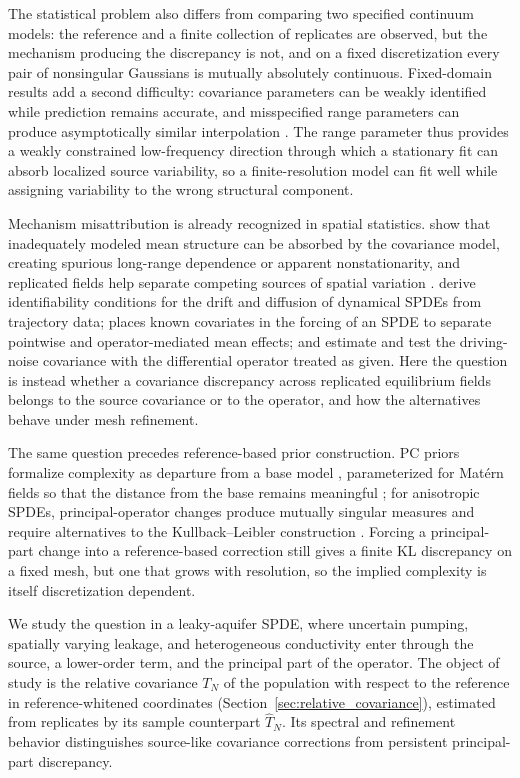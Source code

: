 \documentclass[11pt]{article}
\numberwithin{table}{section}
\numberwithin{figure}{section}
\begin{document}
The statistical problem also differs from comparing two specified continuum models: the reference and a finite collection of replicates are observed, but the mechanism producing the discrepancy is not, and on a fixed discretization every pair of nonsingular Gaussians is mutually absolutely continuous. Fixed-domain results add a second difficulty: covariance parameters can be weakly identified while prediction remains accurate, and misspecified range parameters can produce asymptotically similar interpolation \citep{Stein1999,Zhang2004,KaufmanShaby2013}. The range parameter thus provides a weakly constrained low-frequency direction through which a stationary fit can absorb localized source variability, so a finite-resolution model can fit well while assigning variability to the wrong structural component.

Mechanism misattribution is already recognized in spatial statistics. \citet{Fuglstad2015} show that inadequately modeled mean structure can be absorbed by the covariance model, creating spurious long-range dependence or apparent nonstationarity, and replicated fields help separate competing sources of spatial variation \citep{Ingebrigtsen2015}. \citet{CuiHe2027} derive identifiability conditions for the drift and diffusion of dynamical SPDEs from trajectory data; \citet{Bolin2026} places known covariates in the forcing of an SPDE to separate pointwise and operator-mediated mean effects; and \citet{PeterssonSchroers2025} estimate and test the driving-noise covariance with the differential operator treated as given. Here the question is instead whether a covariance discrepancy across replicated equilibrium fields belongs to the source covariance or to the operator, and how the alternatives behave under mesh refinement.

The same question precedes reference-based prior construction. PC priors formalize complexity as departure from a base model \citep{Simpson2017}, parameterized for Mat\'ern fields so that the distance from the base remains meaningful \citep{Fuglstad2019}; for anisotropic SPDEs, principal-operator changes produce mutually singular measures and require alternatives to the Kullback--Leibler construction \citep{LlamazaresElias2026}. Forcing a principal-part change into a reference-based correction still gives a finite KL discrepancy on a fixed mesh, but one that grows with resolution, so the implied complexity is itself discretization dependent.

We study the question in a leaky-aquifer SPDE, where uncertain pumping, spatially varying leakage, and heterogeneous conductivity enter through the source, a lower-order term, and the principal part of the operator. The object of study is the relative covariance $T_N$ of the population with respect to the reference in reference-whitened coordinates (Section~\ref{sec:relative_covariance}), estimated from replicates by its sample counterpart $\widehat T_N$. Its spectral and refinement behavior distinguishes source-like covariance corrections from persistent principal-part discrepancy.
\end{document}
